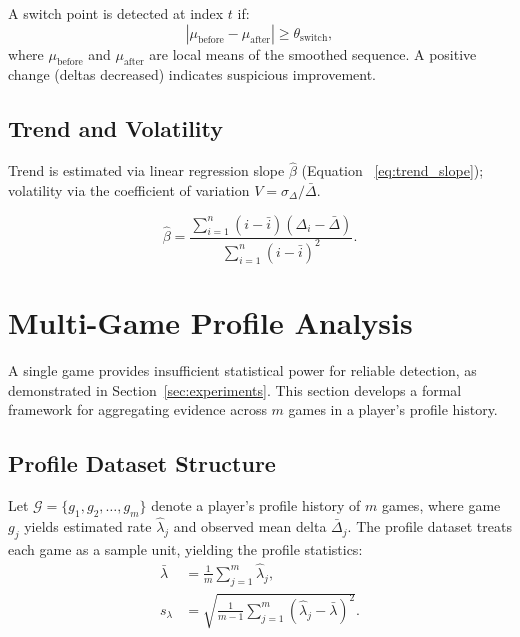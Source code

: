 \documentclass[11pt,a4paper]{article}
\begin{document}
A switch point is detected at index $t$ if:
\begin{equation}
    |\mu_{\text{before}} - \mu_{\text{after}}| \geq \theta_{\text{switch}},
\end{equation}
where $\mu_{\text{before}}$ and $\mu_{\text{after}}$ are local means of the
smoothed sequence. A positive change (deltas decreased) indicates suspicious
improvement.

\subsection{Trend and Volatility}

Trend is estimated via linear regression slope $\hat{\beta}$ (Equation~%
\eqref{eq:trend_slope}); volatility via the coefficient of variation
$V = \sigma_\Delta / \bar{\Delta}$.

\begin{equation}
    \hat{\beta} = \frac{\sum_{i=1}^{n}(i - \bar{i})(\Delta_i - \bar{\Delta})}
    {\sum_{i=1}^{n}(i - \bar{i})^2}.
    \label{eq:trend_slope}
\end{equation}


\section{Multi-Game Profile Analysis}
\label{sec:profile}

A single game provides insufficient statistical power for reliable detection,
as demonstrated in Section~\ref{sec:experiments}. This section develops a
formal framework for aggregating evidence across $m$ games in a player's
profile history.

\subsection{Profile Dataset Structure}

Let $\mathcal{G} = \{g_1, g_2, \ldots, g_m\}$ denote a player's profile
history of $m$ games, where game $g_j$ yields estimated rate
$\hat{\lambda}_j$ and observed mean delta $\bar{\Delta}_j$. The profile
dataset treats each game as a sample unit, yielding the profile statistics:
\begin{align}
    \bar{\lambda} &= \frac{1}{m} \sum_{j=1}^{m} \hat{\lambda}_j,
    \label{eq:profile_mean}\\
    s_\lambda &= \sqrt{\frac{1}{m-1} \sum_{j=1}^{m}
    (\hat{\lambda}_j - \bar{\lambda})^2}.
    \label{eq:profile_std}
\end{align}
\end{document}
